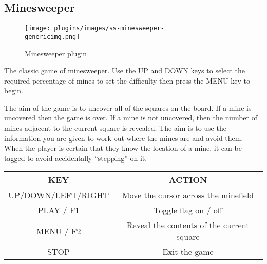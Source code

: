 \subsection{Minesweeper}
\begin{figure}[h!]
\begin{center}
\texttt{[image: plugins/images/ss-minesweeper-\\genericimg.png]}
\end{center}
\caption{Minesweeper plugin}
\end{figure}

The classic game of minesweeper.  Use the UP and DOWN keys to select the
required percentage of mines to set the difficulty then press the MENU
key to begin.

The aim of the game is to uncover all of the squares on the board.  If a
mine is uncovered then the game is over.  If a mine is not uncovered,
then the number of mines adjacent to the current square is revealed. 
The aim is to use the information you are given to work out where the
mines are and avoid them.  When the player is certain that they know
the location of a mine, it can be tagged to avoid accidentally
``stepping'' on it.

\begin{table}[h!]
\begin{tabular}{|c|c|}
\hline
KEY & ACTION \\\hline
UP/DOWN/LEFT/RIGHT & Move the cursor across the minefield \\\hline
PLAY / F1 & Toggle flag on / off \\\hline
MENU / F2 & Reveal the contents of the current square \\\hline
STOP & Exit the game \\\hline
\end{tabular}
\end{table}

